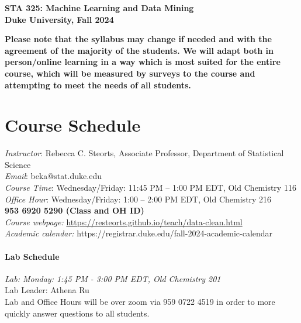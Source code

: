 \documentclass[11pt]{article}
\date{}
\begin{document}
\begin{center}
{\Large\bf STA 325: Machine Learning and Data Mining} \\

{\Large\bf Duke University, Fall 2024} \\
\end{center}

\textbf{Please note that the syllabus may change if needed and with the agreement of the majority of the students. We will adapt both in person/online learning in a way which is most suited for the entire course, which will be measured by surveys to the course and attempting to meet the needs of all students.} \\

\section{Course Schedule}
\emph{Instructor}: Rebecca C. Steorts,  Associate Professor,  Department of Statistical Science\\
\emph{Email}: beka@stat.duke.edu\\
\emph{Course Time}: Wednesday/Friday: 11:45 PM -- 1:00 PM EDT, Old Chemistry 116 \\
\emph{Office Hour}: Wednesday/Friday: 1:00 -- 2:00 PM EDT, Old Chemistry 216\\
\textbf{953 6920 5290 (Class and OH ID)}\\
\emph{Course webpage:} \url{https://resteorts.github.io/teach/data-clean.html} \\
\emph{Academic calendar:} https://registrar.duke.edu/fall-2024-academic-calendar 

\vspace*{1em}

\paragraph{Lab Schedule} 

\emph{Lab: Monday: 1:45 PM - 3:00 PM EDT, Old Chemistry 201}\\ Lab Leader: Athena Ru \\
Lab and Office Hours will be over zoom via 959 0722 4519 in order to more quickly answer questions to all students. 
\end{document}

